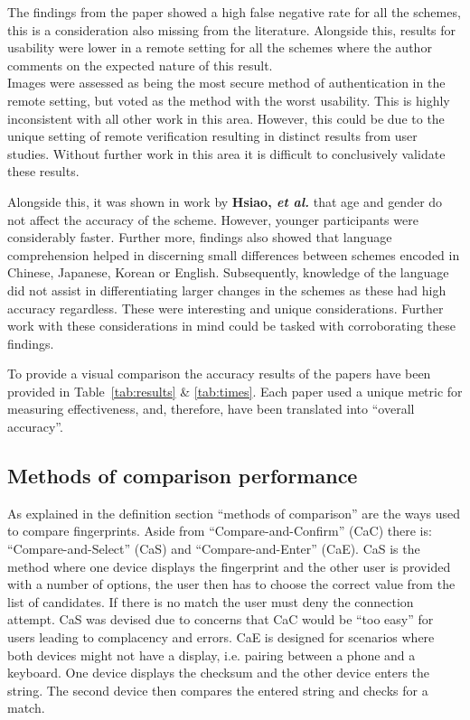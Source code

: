 The findings from the paper showed a high false negative rate for all the schemes, this is a consideration also missing from the literature. Alongside this, results for usability were lower in a remote setting for all the schemes where the author comments on the expected nature of this result.\\
Images were assessed as being the most secure method of authentication in the remote setting, but voted as the method with the worst usability. This is highly inconsistent with all other work in this area. However, this could be due to the unique setting of remote verification resulting in distinct results from user studies. Without further work in this area it is difficult to conclusively validate these results.

Alongside this, it was shown in work by \textbf{Hsiao, \textit{et al.}}\cite{hsiao2009study} that age and gender do not affect the accuracy of the scheme. However, younger participants were considerably faster. Further more, findings also showed that language comprehension helped in discerning small differences between schemes encoded in Chinese, Japanese, Korean or English. Subsequently, knowledge of the language did not assist in differentiating larger changes in the schemes as these had high accuracy regardless. These were interesting and unique considerations. Further work with these considerations in mind could be tasked with corroborating these findings.

To provide a visual comparison the accuracy results of the papers have been provided in Table~\ref{tab:results} \& \ref{tab:times}. Each paper used a unique metric for measuring effectiveness, and, therefore, have been translated into ``overall accuracy''.

\subsection*{Methods of comparison performance}
As explained in the definition section ``methods of comparison'' are the ways used to compare fingerprints. Aside from ``Compare-and-Confirm'' (CaC) there is: ``Compare-and-Select'' (CaS) and ``Compare-and-Enter'' (CaE). CaS is the method where one device displays the fingerprint and the other user is provided with a number of options, the user then has to choose the correct value from the list of candidates. If there is no match the user must deny the connection attempt. CaS was devised due to concerns that CaC would be ``too easy'' for users leading to complacency and errors\cite{uzun2007usability}. CaE is designed for scenarios where both devices might not have a display, i.e. pairing between a phone and a keyboard. One device displays the checksum and the other device enters the string. The second device then compares the entered string and checks for a match.

